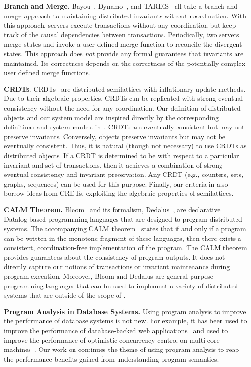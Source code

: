 \textbf{Branch and Merge.}
Bayou~\cite{terry1995managing}, Dynamo~\cite{decandia2007dynamo}, and
TARDiS~\cite{crooks2016tardis} all take a branch and merge approach to
maintaining distributed invariants without coordination. With this approach,
servers execute transactions without any coordination but keep track of the
causal dependencies between transactions. Periodically, two servers merge
states and invoke a user defined merge function to reconcile the divergent
states. This approach does \emph{not} provide any formal guarantees that
invariants are maintained. Its correctness depends on the correctness of the
potentially complex user defined merge functions.

\textbf{CRDTs.}
CRDTs~\cite{shapiro2011conflict, shapiro2011comprehensive} are distributed
semilattices with inflationary update methods. Due to their algebraic
properties, CRDTs can be replicated with strong eventual consistency without
the need for any coordination. Our definition of distributed objects and our
\invariantconfluence{} system model are inspired directly by the corresponding
definitions and system models in~\cite{shapiro2011conflict}.
%
CRDTs are eventually consistent but may not preserve invariants. Conversely,
\invariantconfluent{} objects preserve invariants but may not be eventually
consistent. Thus, it is natural (though not necessary) to use CRDTs as
distributed objects. If a CRDT is determined to be \invariantconfluent{} with
respect to a particular invariant and set of transactions, then it achieves a
combination of strong eventual consistency and invariant preservation. Any CRDT
(e.g., counters, sets, graphs, sequences) can be used for this purpose.
%
Finally, our criteria in  also borrow ideas from CRDTs,
exploiting the algebraic properties of semilattices.

\textbf{CALM Theorem.}
Bloom~\cite{alvaro2010boom, alvaro2011consistency, conway2012logic} and its
formalism, Dedalus~\cite{alvaro2011dedalus, alvaro2013declarative}, are
declarative Datalog-based programming languages that are designed to program
distributed systems. The accompanying CALM
theorem~\cite{hellerstein2010declarative, ameloot2013relational} states that if
and only if a program can be written in the monotone fragment of these
languages, then there exists a consistent, coordination-free implementation of
the program.  The CALM theorem provides guarantees about the consistency of
program outputs. It does not directly capture our notions of transactions or
invariant maintenance during program execution.  Moreover, Bloom and Dedalus
are general-purpose programming languages that can be used to implement a
variety of distributed systems that are outside of the scope of
\invariantconfluence{}.

\textbf{Program Analysis in Database Systems.} Using program analysis to
improve the performance of database systems is not new. For example, it has
been used to improve the performance of database-backed web
applications~\cite{cheung2014using, wu2016transaction,
ramachandra2012program} and used to improve the performance of optimistic
concurrency control on multi-core machines~\cite{wu2016transaction}. Our work
on \invariantconfluence{} continues the theme of using program analysis to
reap the performance benefits gained from understanding program semantics.

